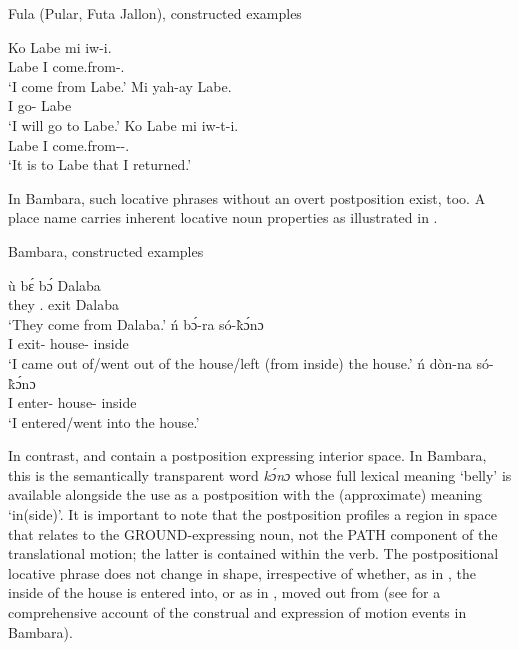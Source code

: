 \documentclass[output=paper]{langscibook}
\begin{document}
\begin{exe}
    \ex\label{fanego:ex:8} Fula (Pular, Futa Jallon), constructed examples
    \begin{xlist}
        \ex\label{fanego:ex:8a} 
        \gll Ko Labe mi iw-i. \\
        \FOC{} Labe I come.from-\REL.\PFV{} \\
        \glt ‘I come from Labe.’
        \ex\label{fanego:ex:8b} 
        \gll Mi yah-ay Labe. \\
        I go-\IPFV{} Labe \\
        \glt ‘I will go to Labe.’
        \ex\label{fanego:ex:8c} 
        \gll Ko Labe mi iw-t-i. \\
        \FOC{} Labe I come.from-\REV-\REL.\PFV{} \\
        \glt ‘It is to Labe that I returned.’
    \end{xlist}
\end{exe}
In Bambara, such locative phrases without an overt postposition exist, too. A place name carries inherent locative noun properties as illustrated in . \\


    \begin{exe}
        \ex\label{fanego:ex:9} Bambara, constructed examples
        \begin{xlist}
            \ex\label{fanego:ex:9a} 
            \gll ù bɛ́ bɔ́ Dalaba \\
            they \IPFV.\AFF{} exit Dalaba \\
            \glt ‘They come from Dalaba.’
            \ex\label{fanego:ex:9b} 
            \gll ń bɔ́-ra só-\` kɔ́nɔ \\
            I exit-\PFV{} house-\ART{} inside \\
            \glt ‘I came out of/went out of the house/left (from inside) the house.’
            \ex\label{fanego:ex:9c} 
            \gll ń dòn-na só-\` kɔ́nɔ \\
            I enter-\PFV{} house-\ART{} inside \\
            \glt ‘I entered/went into the house.’
        \end{xlist}
    \end{exe}


\noindent
In contrast,  and  contain a postposition expressing interior space. In Bambara, this is the semantically transparent word \textit{kɔ́nɔ} whose full lexical meaning ‘belly’ is available alongside the use as a postposition with the (approximate) meaning ‘in(side)’. It is important to note that the postposition profiles a region in space that relates to the GROUND-expressing noun, not the PATH component of the translational motion; the latter is contained within the verb. The postpositional locative phrase does not change in shape, irrespective of whether, as in , the inside of the house is entered into, or as in , moved out from (see \citealt{dombrowsky-hahn_motion_2012} for a comprehensive account of the construal and expression of motion events in Bambara). 
\end{document}
